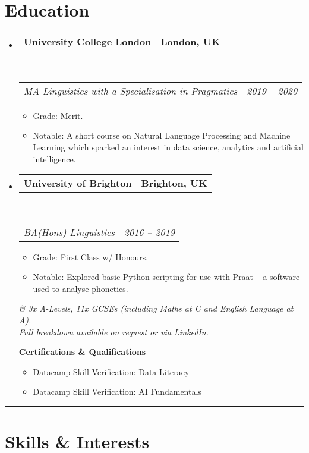 \documentclass[10pt,a4paper]{article}
\makeatletter
\newcommand{\headerrow}[2]
{\begin{tabular*}{\linewidth}{l@{\extracolsep{\fill}}r}
	#1 &
	#2 \\
\end{tabular*}}
\makeatother
\begin{document}
\section*{Education}

\begin{itemize}
	\parskip=0.1em

	\item 
	\headerrow
		{\textbf{University College London}}
		{\textbf{London, UK}}
	\\
	\headerrow
		{\emph{MA Linguistics with a Specialisation in Pragmatics}}
		{\emph{2019 -- 2020}}
	\begin{itemize}
		\item Grade: Merit.
		\item Notable: A short course on Natural Language Processing and Machine Learning which sparked an interest in data science, analytics and artificial intelligence.
	\end{itemize}
    \item 
	\headerrow
		{\textbf{University of Brighton}}
		{\textbf{Brighton, UK}}
	\\
	\headerrow
		{\emph{BA(Hons) Linguistics}}
		{\emph{2016 -- 2019}}
	\begin{itemize}
		\item Grade: First Class w/ Honours.
		\item Notable: Explored basic Python scripting for use with Praat -- a software used to analyse phonetics.
	\end{itemize}
	\begin{center}
        \emph{\color{gray}\small \& 3x A-Levels, 11x GCSEs (including Maths at C and English Language at A). \\ Full breakdown available on request or via \href{https://www.linkedin.com/in/artydh}{LinkedIn}.}
    \end{center}
	\textbf{Certifications \& Qualifications}
	\begin{itemize}
		\item Datacamp Skill Verification: Data Literacy
		\item Datacamp Skill Verification: AI Fundamentals
	\end{itemize}
\end{itemize}

\hrule
\vspace{1.75em}

\section*{Skills \& Interests}
\end{document}
